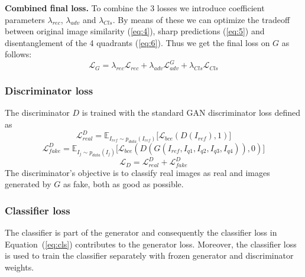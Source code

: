 \documentclass[12pt,a4paper]{article}
\begin{document}
\textbf{Combined final loss.} To combine the 3 losses we introduce coefficient parameters $\lambda_{rec}$, $\lambda_{adv}$ and $\lambda_{Cls}$. By means of these we can optimize the tradeoff between original image similarity (\ref{eq:4}), sharp predictions (\ref{eq:5}) and disentanglement of the 4 quadrants (\ref{eq:6}). Thus we get the final loss on $G$ as follows:
\begin{equation} \label{eq:g_loss_comp}
    \mathcal{L}_{G} = \lambda_{rec} \mathcal{L}_{rec} + \lambda_{adv} \mathcal{L}^G_{adv} + \lambda_{Cls} \mathcal{L}_{Cls}
\end{equation}

\subsubsection{Discriminator loss}
The discriminator $D$ is trained with the standard GAN discriminator loss defined as
\begin{equation} \label{eq:lorbms_D_real}
    \mathcal{L}^D_{real} = \mathbb{E}_{I_{ref}\sim p_{data} (I_{ref})}\big[ \mathcal{L}_{bce}(D(I_{ref}), 1)\big]
\end{equation}
\begin{equation} \label{eq:lorbms_D_fake}
    \mathcal{L}^D_{fake} =  \mathbb{E}_{I_{j}\sim p_{data} (I_{j})}\big[ \mathcal{L}_{bce}(D(G(I_{ref},I_{q1},I_{q2},I_{q3},I_{q4})), 0)\big]
\end{equation}
\begin{equation} \label{eq:lorbms_D}
    \mathcal{L}_{D} = \mathcal{L}^D_{real} + \mathcal{L}^D_{fake}
\end{equation}
The discriminator's objective is to classify real images as real and images generated by $G$ as fake, both as good as possible.

\subsubsection{Classifier loss}
The classifier is part of the generator and consequently the classifier loss in Equation~(\ref{eq:cls}) contributes to the generator loss. Moreover, the classifier loss is used to train the classifier separately with frozen generator and discriminator weights.


\end{document}
